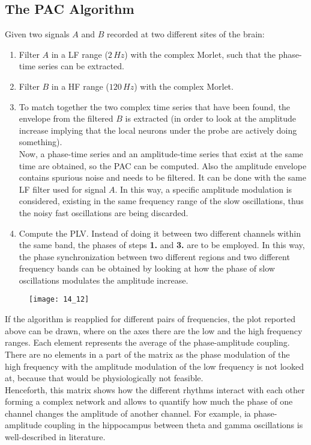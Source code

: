 \subsection{The PAC Algorithm}
Given two signals \(A\) and \(B\) recorded at two different sites of the brain:
\begin{enumerate}
    \item Filter \(A\) in a LF range (\(2\,Hz\)) with the complex Morlet, such that the phase-time
          series can be extracted.
    \item Filter \(B\) in a HF range (\(120\,Hz\)) with the complex Morlet.
    \item To match together the two complex time series that have been found, the envelope from the
          filtered \(B\) is extracted (in order to look at the amplitude increase implying that the local
          neurons under the probe are actively doing something).\\
          Now, a phase-time series and an amplitude-time series that exist at the same time are obtained,
          so the PAC can be computed. Also the amplitude envelope contains spurious noise and needs to
          be filtered. It can be done with the same LF filter used for signal \(A\). In this way,
          a specific amplitude modulation is considered, existing in the same frequency range of the
          slow oscillations, thus the noisy fast oscillations are being discarded.
    \item Compute the PLV. Instead of doing it between two different channels within the same band,
          the phases of steps \textbf{1.} and \textbf{3.} are to be employed. In this way, the phase
          synchronization between two different regions and two different frequency bands can be obtained
          by looking at how the phase of slow oscillations modulates the amplitude increase.
\end{enumerate}
\begin{figure}[H]
    \centering
    \texttt{[image: 14\_12]}
\end{figure}
If the algorithm is reapplied for different pairs of frequencies, the plot reported above can be drawn,
where on the axes there are the low and the high frequency ranges. Each element represents the average
of the phase-amplitude coupling. There are no elements in a part of the matrix as the phase modulation
of the high frequency with the amplitude modulation of the low frequency is not looked at, because that
would be physiologically not feasible.\\
Henceforth, this matrix shows how the different rhythms interact with each other forming a complex
network and allows to quantify how much the phase of one channel changes the amplitude of another
channel. For example, ia phase-amplitude coupling in the hippocampus between theta and gamma oscillations
is well-described in literature.\\
